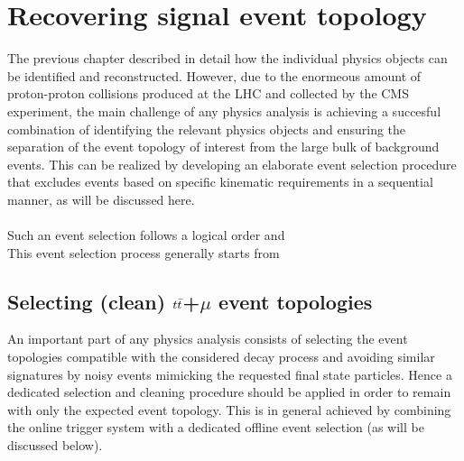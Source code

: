 \chapter{Recovering signal event topology} \label{chp:labelTitle}

The previous chapter described in detail how the individual physics objects can be identified and reconstructed.
However, due to the enormeous amount of proton-proton collisions produced at the LHC and collected by the CMS experiment, the main challenge of any physics analysis is achieving a succesful combination of identifying the relevant physics objects and ensuring the separation of the event topology of interest from the large bulk of background events.
This can be realized by developing an elaborate event selection procedure that excludes events based on specific kinematic requirements in a sequential manner, as will be discussed here.
\\
\\
Such an event selection follows a logical order and  \\
This event selection process generally starts from 

\section{Selecting (clean) $t\bar{t}$+$\mu$ event topologies}\label{sec::MainSelec}
An important part of any physics analysis consists of selecting the event topologies compatible with the considered decay process and avoiding similar signatures by noisy events mimicking the requested final state particles. Hence a dedicated selection and cleaning procedure should be applied in order to remain with only the expected event topology. This is in general achieved by combining the online trigger system with a dedicated offline event selection (as will be discussed below).

